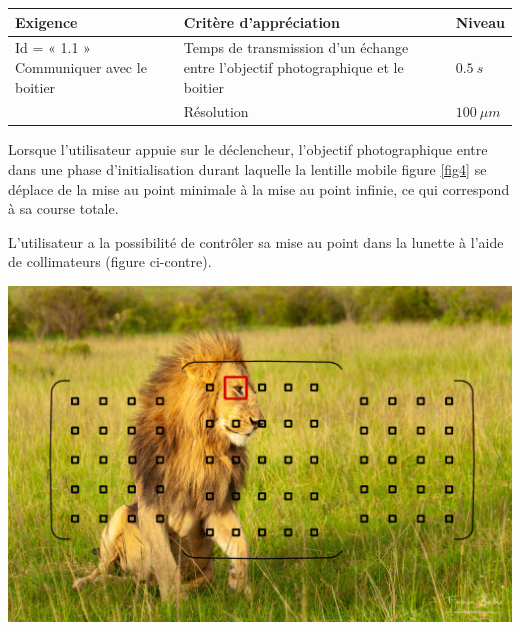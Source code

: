 \begin{center}
\begin{tabular}{|p{}|p{}|p{}|}
\hline 
\textbf{Exigence} & \textbf{Critère d'appréciation} & \textbf{Niveau} \\ 
\hline 
Id = « 1.1 » Communiquer avec le boitier & Temps de transmission d'un échange entre l'objectif photographique et le boitier & $\SI{0,5}{s}$ \\ 
\cline{2-3}
& Résolution & $\SI{100}{\mu m}$ \\ 
\hline 
\end{tabular} 
\end{center}


\noindent\begin{minipage}{0.55\textwidth}
Lorsque l'utilisateur appuie sur le déclencheur, l'objectif
photographique entre dans une phase d'initialisation durant laquelle la
lentille mobile figure \ref{fig4} se déplace de
la mise au point minimale à la mise au point infinie, ce qui correspond
à sa course totale.

L'utilisateur a la possibilité de contrôler sa mise au point dans la lunette à l'aide de collimateurs (figure ci-contre).
\end{minipage}\hfill
\begin{minipage}{0.4\textwidth}
\begin{center}
\includegraphics[width=.9\textwidth]{images/collimateurs.jpg}
\end{center}
\end{minipage}

